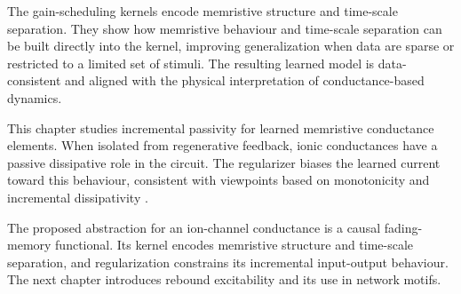 The gain-scheduling kernels encode memristive structure and time-scale separation. They show
how memristive behaviour and time-scale separation can be built directly into the
kernel, improving generalization when data are sparse or restricted to a limited
set of stimuli. The resulting learned model is data-consistent and aligned with the physical interpretation of conductance-based dynamics.

This chapter studies incremental passivity for learned memristive conductance elements. When isolated from regenerative feedback, ionic conductances have a passive dissipative role in the circuit. The regularizer biases the learned current toward this behaviour, consistent with viewpoints based on monotonicity and incremental dissipativity \cite{sepulchre_spiking_2022,sepulchre_incremental_2022}.


The proposed abstraction for an ion-channel conductance is a causal fading-memory functional. Its kernel encodes memristive structure and time-scale separation, and regularization constrains its incremental input-output behaviour. The next chapter introduces rebound excitability and its use in network motifs.
